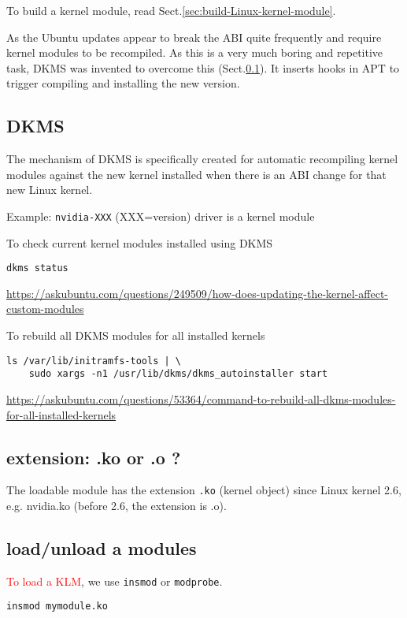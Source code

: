 To build a kernel module, read Sect.\ref{sec:build-Linux-kernel-module}.


As the Ubuntu updates appear to break the ABI quite frequently and require
kernel modules to be recompiled. As this is a very much boring and repetitive
task, DKMS was invented to overcome this (Sect.\ref{sec:DKMS}). 
It inserts hooks in APT to trigger compiling and installing the new version.

\subsection{DKMS}
\label{sec:DKMS}

The mechanism of DKMS is specifically created for automatic recompiling
kernel modules against the new kernel installed when there is an ABI change for
that new Linux kernel.

Example: \verb!nvidia-XXX! (XXX=version) driver is a kernel module

To check current kernel modules installed using DKMS
\begin{verbatim}
dkms status
\end{verbatim}
\url{https://askubuntu.com/questions/249509/how-does-updating-the-kernel-affect-custom-modules}


To rebuild all DKMS modules for all installed kernels
\begin{verbatim}
ls /var/lib/initramfs-tools | \
    sudo xargs -n1 /usr/lib/dkms/dkms_autoinstaller start
\end{verbatim}
\url{https://askubuntu.com/questions/53364/command-to-rebuild-all-dkms-modules-for-all-installed-kernels}


\subsection{extension: .ko or .o ?}

The loadable module has the extension \verb!.ko! (kernel object) since Linux
kernel 2.6, e.g. nvidia.ko (before 2.6, the extension is .o). 

\subsection{load/unload a modules}
\label{sec:rmmod}
\label{sec:load-module}
\label{sec:unload-module}
\label{sec:insmod}
\label{sec:modprobe}


\textcolor{red}{To load a KLM}, we use \verb!insmod! or \verb!modprobe!.
\begin{verbatim}
insmod mymodule.ko
\end{verbatim}

